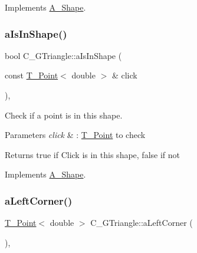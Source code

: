 Implements \hyperlink{classA__Shape_a63f825cbc9780208d9a137f5c14917d0}{A\+\_\+\+Shape}.

\mbox{\label{classC__GTriangle_a417b28c74dd35f81a19b5bd1d214ba8d}} 
\subsubsection{\texorpdfstring{a\+Is\+In\+Shape()}{aIsInShape()}\hspace{0.1cm}{\footnotesize\ttfamily [2/2]}}
{\footnotesize\ttfamily bool C\+\_\+\+G\+Triangle\+::a\+Is\+In\+Shape (\begin{DoxyParamCaption}\item[{const \hyperlink{classT__Point}{T\+\_\+\+Point}$<$ double $>$ \&}]{click }\end{DoxyParamCaption})\hspace{0.3cm}{\ttfamily [override]}, {\ttfamily [virtual]}}



Check if a point is in this shape. 


\begin{DoxyParams}{Parameters}
{\em click} & \+: \hyperlink{classT__Point}{T\+\_\+\+Point} to check \\
\hline
\end{DoxyParams}
\begin{DoxyReturn}{Returns}
true if Click is in this shape, false if not 
\end{DoxyReturn}


Implements \hyperlink{classA__Shape_a63f825cbc9780208d9a137f5c14917d0}{A\+\_\+\+Shape}.

\mbox{\label{classC__GTriangle_a57943afaad0f6b7c3c13aa35a233e93b}} 
\subsubsection{\texorpdfstring{a\+Left\+Corner()}{aLeftCorner()}\hspace{0.1cm}{\footnotesize\ttfamily [1/2]}}
{\footnotesize\ttfamily \hyperlink{classT__Point}{T\+\_\+\+Point}$<$ double $>$ C\+\_\+\+G\+Triangle\+::a\+Left\+Corner (\begin{DoxyParamCaption}{ }\end{DoxyParamCaption})\hspace{0.3cm}{\ttfamily [override]}, {\ttfamily [virtual]}}



